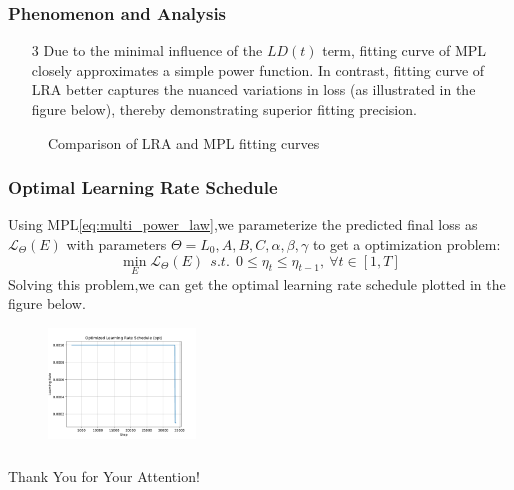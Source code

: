 \documentclass[aspectratio=169]{beamer}
\begin{document}
\begin{frame}
    \frametitle{Phenomenon and Analysis}
    \begin{enumerate}
        \item[3] Due to the minimal influence of the $LD(t)$ term,
            fitting curve of MPL closely approximates a simple power function.
            In contrast, fitting curve of LRA better captures the
            nuanced variations in loss (as illustrated in the figure
            below), thereby demonstrating superior fitting precision.
    \end{enumerate}
    \begin{figure}
        \centering

        \caption{Comparison of LRA and MPL fitting curves}\label{fig:figure3}
    \end{figure}
\end{frame}

\begin{frame}
    \frametitle{Optimal Learning Rate Schedule}
    Using MPL\eqref{eq:multi_power_law},we parameterize the predicted
    final loss as $\mathcal{L}_\Theta(E)$ with parameters $\Theta =
    {L_0,A,B,C,\alpha,\beta,\gamma}$ to get a optimization problem:
    $$
    \min_E \mathcal{L}_\Theta(E) \ \ s.t.
    \ \ 0\le\eta_t\le\eta_{t-1}, \ \forall t\in[1,T]
    $$
    Solving this problem,we can get the optimal learning rate
    schedule plotted in the figure below.
    \begin{figure}
        \centering
        \includegraphics[width=0.35\textwidth]{fig/opt/opt.pdf}
    \end{figure}

\end{frame}

\begin{frame}
    \frametitle{}
    \begin{center}
        \Huge Thank You for Your Attention!
    \end{center}
\end{frame}
\end{document}
